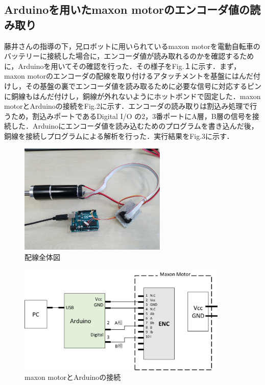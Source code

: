 \documentclass[a4j，10pt]{jarticle}
\begin{document}
\subsection{Arduinoを用いたmaxon motorのエンコーダ値の読み取り}
藤井さんの指導の下，兄ロボットに用いられているmaxon motorを電動自転車のバッテリーに接続した場合に，エンコーダ値が読み取れるのかを確認するために，Arduinoを用いてその確認を行った．その様子をFig.１に示す．まず，maxon motorのエンコーダの配線を取り付けるアタッチメントを基盤にはんだ付けし，その基盤の裏でエンコーダ値を読み取るために必要な信号に対応するピンに銅線もはんだ付けし，銅線が外れないようにホットボンドで固定した．maxon motorとArduinoの接続をFig.2に示す．エンコーダの読み取りは割込み処理で行うため，割込みポートであるDigital I/O の2，3番ポートにA層，B層の信号を接続した．Arduinoにエンコーダ値を読み込むためのプログラムを書き込んだ後，銅線を接続しプログラムによる解析を行った．実行結果をFig.3に示す．


\begin{figure}[htbp]
	\begin{center}
      \includegraphics[width=7.0cm,bb=0 0 4032 3024]{cable.jpg}
        \caption{配線全体図}
        \label{ラベル1}
     \end{center}
\end{figure}

\begin{figure}[htbp]
	\begin{center}
      \includegraphics[width=10cm,bb=0 0 1074 562 ]{connect.jpg}
        \caption{maxon motorとArduinoの接続}
        \label{ラベル2}
     \end{center}
\end{figure}
\end{document}
